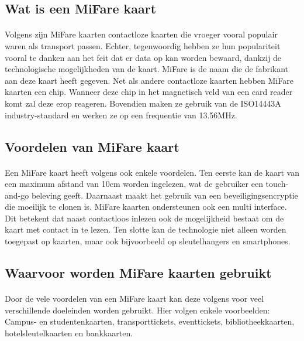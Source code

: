 \bigskip
\subsection{Wat is een MiFare kaart}
\paragraph{}
Volgens \textcite{Digitalid} zijn MiFare kaarten contactloze kaarten die vroeger vooral populair waren als transport passen. Echter, tegenwoordig hebben ze hun populariteit vooral te danken aan het feit dat er data op kan worden bewaard, dankzij de technologische mogelijkheden van de kaart. MiFare is de naam die de fabrikant aan deze kaart heeft gegeven. 
Net als andere contactloze kaarten hebben MiFare kaarten een chip. Wanneer deze chip in het magnetisch veld van een card reader komt zal deze erop reageren. Bovendien maken ze gebruik van de ISO14443A industry-standard en werken ze op een frequentie van 13.56MHz.

\bigskip
\subsection{Voordelen van MiFare kaart}
\paragraph{}
Een MiFare kaart heeft volgens \textcite{Printplast} ook enkele voordelen. Ten eerste kan de kaart van een maximum afstand van 10cm worden ingelezen, wat de gebruiker een touch-and-go beleving geeft.
Daarnaast maakt het gebruik van een beveiligingsencryptie die moeilijk te clonen is. MiFare kaarten ondersteunen ook een multi interface. Dit betekent dat naast contactloos inlezen ook de mogelijkheid bestaat om de kaart met contact in te lezen. Ten slotte kan de technologie niet alleen worden toegepast op kaarten, maar ook bijvoorbeeld op sleutelhangers en smartphones.

\bigskip
\subsection{Waarvoor worden MiFare kaarten gebruikt}
\paragraph{}
Door de vele voordelen van een MiFare kaart kan deze volgens \textcite{Digitalid} voor veel verschillende doeleinden worden gebruikt. Hier volgen enkele voorbeelden: Campus- en studentenkaarten, transporttickets, eventtickets, bibliotheekkaarten, hotelsleutelkaarten en bankkaarten.

